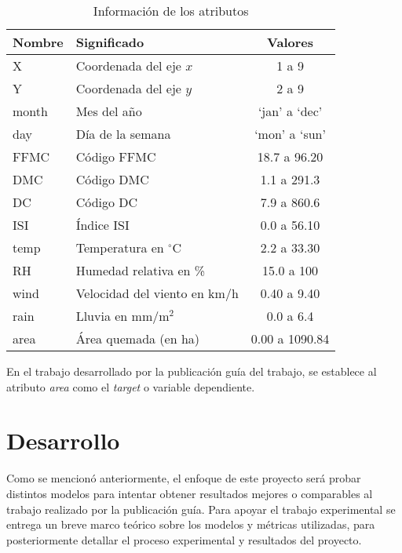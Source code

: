 \documentclass[spanish]{article}
\begin{document}
            \begin{table}[!ht]
            	\centering
                \caption{Información de los atributos}
                \begin{tabular}{llc}
                	\hline
                	Nombre & Significado & Valores \\
                    \hline \hline
                    X & Coordenada del eje $x$ & 1 a 9 \\
                    Y & Coordenada del eje $y$ & 2 a 9 \\
                    month & Mes del año & `jan' a `dec' \\
                    day & Día de la semana & `mon' a `sun' \\ 
                    FFMC & Código FFMC  & 18.7 a 96.20 \\
                    DMC & Código DMC & 1.1 a 291.3 \\
                    DC & Código DC & 7.9 a 860.6 \\
                    ISI & Índice ISI  & 0.0 a 56.10 \\
                    temp & Temperatura en $^{\circ}$C & 2.2 a 33.30 \\
                    RH & Humedad relativa en \% & 15.0 a 100 \\
                    wind & Velocidad del viento en km/h & 0.40 a 9.40 \\
                    rain & Lluvia en mm/m$^2$ & 0.0 a 6.4 \\
                    area & Área quemada (en ha) & 0.00 a 1090.84 \\
                    \hline
                \end{tabular}
                \label{tab:attributes}
            \end{table}
            
            En el trabajo desarrollado por la publicación guía del trabajo, se establece al atributo \emph{area}
            como el \emph{target} o variable dependiente.
            
    \section{Desarrollo}
    
        Como se mencionó anteriormente, el enfoque de este proyecto será probar distintos modelos para intentar obtener
        resultados mejores o comparables al trabajo realizado por la publicación guía. Para apoyar el trabajo experimental
        se entrega un breve marco teórico sobre los modelos y métricas utilizadas, para posteriormente detallar el proceso 
        experimental y resultados del proyecto.
        
\end{document}
